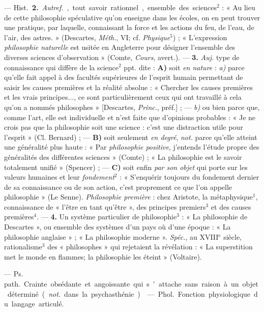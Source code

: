 \begin{itemize}[leftmargin=1cm, label=, itemsep=1pt]
— \si{Hist.} {\bf 2.} {\it Autref.}, tout savoir rationnel, ensemble des
sciences$^2$ : « Au lieu de cette philosophie spéculative qu’on enseigne dans
les écoles, on en peut trouver une pratique, par laquelle, connaissant la
force et les actions du feu, de l’eau, de l'air, des astres. » (Descartes,
{\it Méth.}, VI; cf. {\it Physique}$^5$) ; « L'expression {\it philosophie
naturelle} est usitée en Angleterre pour désigner l’ensemble des diverses
sciences d'observation » (Comte, {\it Cours}, avert.). — {\bf 3.} {\it Auj.}
type de connaissance qui diffère de la science$^2$ ppt. dite : {\bf A)} soit
{\it en nature} : {\it a)} parce qu’elle fait appel à des facultés
supérieures de l’esprit
humain permettant de saisir les causes premières et la réalité absolue : «
Chercher les causes premières et les vrais principes..., ce sont
particulièrement ceux qui ont travaillé à cela qu’on a nommés philosophes
» [Descartes, {\it Princ.}, préf.] ; — {\it b)} ou bien parce que, comme
l’art, elle est individuelle et n’est faite que d'opinions probables : « Je
ne crois pas que la philosophie soit une science : c’est une distraction
utile pour l'esprit » (Cl. Bernard) ; — {\bf B)} soit seulement {\it en
degré}, {\it not.} parce qu’elle atteint une généralité plus haute : « Par
{\it philosophie positive}, j'entends l’étude propre des généralités des
différentes sciences » (Comte) ; « La philosophie est le savoir totalement
unifié » (Spencer) ; — {\bf C)} soit enfin {\it par son objet} qui porte sur
les valeurs humaines et leur {\it fondement}$^2$ : « S’enquérir toujours du
fondement dernier de sa connaissance ou de son action, c’est proprement ce
que l’on appelle philosophie » (Le Senne). {\it Philosophie première} : chez
Aristote, la métaphysique$^1$, connaissance de « l'être en tant qu'être »,
des principes premiers$^3$ et des causes premières$^4$. — {\bf 4.} Un système
particulier de philosophie$^3$ : « La philosophie de Descartes », ou ensemble
des systèmes d'un pays où d’une époque : « La philosophie anglaise » ; « La
philosophie moderne ». {\it Spéc.}, au {\footnotesize XVIII}$^\text{e}$
siècle, rationalisme$^3$ des « philosophes » qui rejetaient la révélation : «
La superstition met le monde en flammes; la philosophie les éteint
» (Voltaire).

 — \si{Ps. path.} Crainte obsédante et angoissante qui s'attache
sans raison à un objet déterminé ({\it not.} dans la psychasthénie).

 — \si{Phol.} Fonction physiologique du langage articulé.


\end{itemize}
